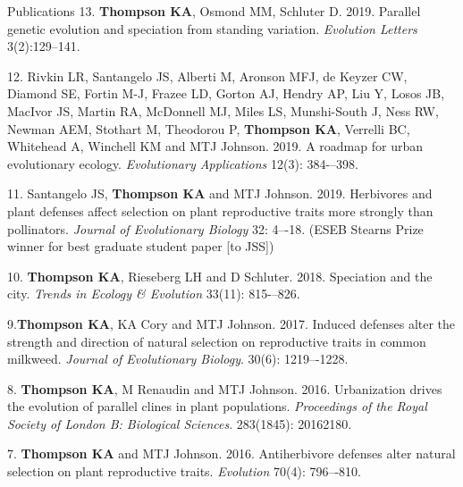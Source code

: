\documentclass[11pt]{article}
\begin{document}
\begin{rSection}{Publications}
\noindent\hspace{.1cm}13. \textbf{Thompson KA}, Osmond MM, Schluter D. 2019. Parallel genetic evolution and speciation from standing variation. \textit{Evolution Letters} 3(2):129--141. %

\noindent\hspace{.1cm}12. Rivkin LR, Santangelo JS, Alberti M, Aronson MFJ, de Keyzer CW, Diamond SE, Fortin M-J, Frazee LD, Gorton AJ, Hendry AP, Liu Y, Losos JB, MacIvor JS, Martin RA, McDonnell MJ, Miles LS, Munshi-South J, Ness RW, Newman AEM, Stothart M, Theodorou P, \textbf{Thompson KA}, Verrelli BC, Whitehead A, Winchell KM and MTJ Johnson. 2019. A roadmap for urban evolutionary ecology. \textit{Evolutionary Applications} 12(3): 384-–398. %

\noindent\hspace{.1cm}11. Santangelo JS, \textbf{Thompson KA} and MTJ Johnson. 2019. Herbivores and plant defenses affect selection on plant reproductive traits more strongly than pollinators. \textit{Journal of Evolutionary Biology} 32: 4–-18. %
(ESEB Stearns Prize winner for best graduate student paper [to JSS])

\noindent\hspace{.1cm}10. \textbf{Thompson KA}, Rieseberg LH and D Schluter. 2018. Speciation and the city. \textit{Trends in Ecology \& Evolution} 33(11): 815-–826. %

\noindent\hspace{.1cm}9.\quad \textbf{Thompson KA}, KA Cory and MTJ Johnson. 2017. Induced defenses alter the strength and direction of natural selection on reproductive traits in common milkweed. \textit{Journal of Evolutionary Biology}. 30(6): 1219–-1228. %

\noindent\hspace{.1cm}8. \textbf{Thompson KA}, M Renaudin and MTJ Johnson. 2016. Urbanization drives the evolution of parallel clines in plant populations. \textit{Proceedings of the Royal Society of London B: Biological Sciences}. 283(1845): 20162180. %

\noindent\hspace{.1cm}7. \textbf{Thompson KA} and MTJ Johnson. 2016. Antiherbivore defenses alter natural selection on plant reproductive traits. \textit{Evolution} 70(4): 796–-810. %


\end{rSection}
\end{document}
